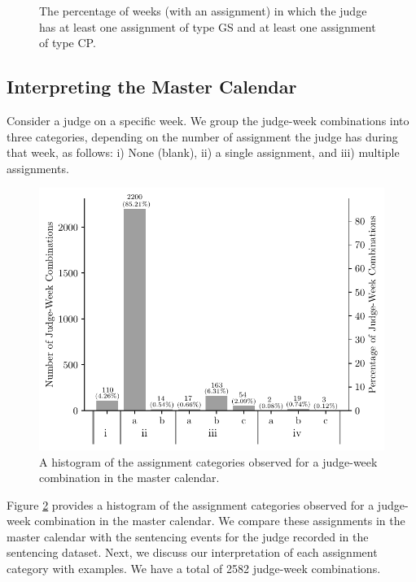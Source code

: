 \documentclass[11pt, oneside]{article}   	%
\theoremstyle{ModifiedStyle}
\begin{document}
\begin{figure}[H]
\begin{minipage}{\textwidth}
			\vspace{-3mm}
			\caption{The percentage of weeks (with an assignment) in which the judge has at least one assignment of type GS and at least one assignment of type CP.}
			\label{Figure_Judge_Schedule_GS_CP_Percentage_Histogram}
		\end{minipage}
	\end{figure}

	\subsection{Interpreting the Master Calendar}
		\label{Sec:Master_Calendar:Interpreting_Master_Calendar}

		Consider a judge on a specific week. We group the judge-week combinations into three categories, depending on the number of assignment the judge has during that week, as follows: i) None (blank), ii) a single assignment, and iii) multiple assignments.

		\begin{figure}[h!]
			\centering
			\includegraphics[scale=0.75]{Figures/Simultaneous_Assignment_Count_Histogram}
			\caption{A histogram of the assignment categories observed for a judge-week combination in the master calendar.}
			\label{Figure_Simultaneous_Assignment_Count_Histogram}
		\end{figure}

		Figure \ref{Figure_Simultaneous_Assignment_Count_Histogram} provides a histogram of the assignment categories observed for a judge-week combination in the master calendar. We compare these assignments in the master calendar with the sentencing events for the judge recorded in the sentencing dataset. Next, we discuss our interpretation  of each assignment category with examples. We have a total of 2582 judge-week combinations.
\end{document}
